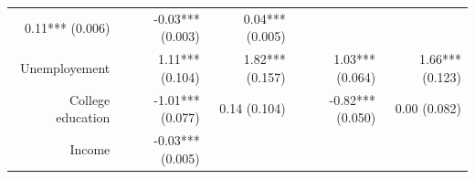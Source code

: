 \documentclass[]{article}
\begin{document}
\begin{longtable}[c]{@{}rrrrr@{}}
\begin{minipage}[t]{0.16\columnwidth}
0.11*** (0.006)
\strut\end{minipage} &
\begin{minipage}[t]{0.18\columnwidth}\raggedleft\strut
-0.03*** (0.003)
\strut\end{minipage} &
\begin{minipage}[t]{0.15\columnwidth}\raggedleft\strut
0.04*** (0.005)
\strut\end{minipage}\tabularnewline
\begin{minipage}[t]{0.17\columnwidth}\raggedleft\strut
Unemployement
\strut\end{minipage} &
\begin{minipage}[t]{0.20\columnwidth}\raggedleft\strut
1.11*** (0.104)
\strut\end{minipage} &
\begin{minipage}[t]{0.16\columnwidth}\raggedleft\strut
1.82*** (0.157)
\strut\end{minipage} &
\begin{minipage}[t]{0.18\columnwidth}\raggedleft\strut
1.03*** (0.064)
\strut\end{minipage} &
\begin{minipage}[t]{0.15\columnwidth}\raggedleft\strut
1.66*** (0.123)
\strut\end{minipage}\tabularnewline
\begin{minipage}[t]{0.17\columnwidth}\raggedleft\strut
College education
\strut\end{minipage} &
\begin{minipage}[t]{0.20\columnwidth}\raggedleft\strut
-1.01*** (0.077)
\strut\end{minipage} &
\begin{minipage}[t]{0.16\columnwidth}\raggedleft\strut
0.14 (0.104)
\strut\end{minipage} &
\begin{minipage}[t]{0.18\columnwidth}\raggedleft\strut
-0.82*** (0.050)
\strut\end{minipage} &
\begin{minipage}[t]{0.15\columnwidth}\raggedleft\strut
0.00 (0.082)
\strut\end{minipage}\tabularnewline
\begin{minipage}[t]{0.17\columnwidth}\raggedleft\strut
Income
\strut\end{minipage} &
\begin{minipage}[t]{0.20\columnwidth}\raggedleft\strut
-0.03*** (0.005)
\strut\end{minipage} &
\begin{minipage}[t]{0.16\columnwidth}\raggedleft\strut

\end{minipage}
\end{longtable}
\end{document}
